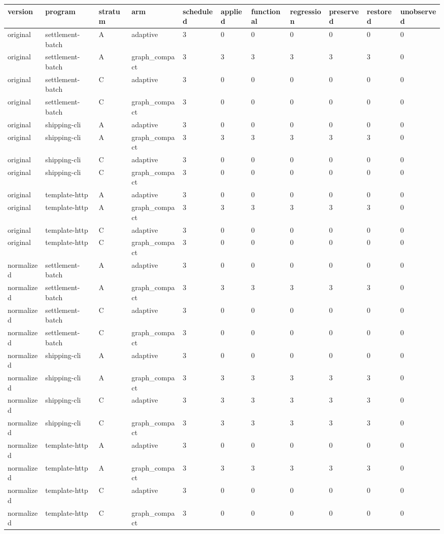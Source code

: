 \begin{tabular}{lllllllllll}
version & program & stratum & arm & scheduled & applied & functional & regression & preserved & restored & unobserved \\
\hline
original & settlement-batch & A & adaptive & 3 & 0 & 0 & 0 & 0 & 0 & 0 \\
original & settlement-batch & A & graph\_compact & 3 & 3 & 3 & 3 & 3 & 3 & 0 \\
original & settlement-batch & C & adaptive & 3 & 0 & 0 & 0 & 0 & 0 & 0 \\
original & settlement-batch & C & graph\_compact & 3 & 0 & 0 & 0 & 0 & 0 & 0 \\
original & shipping-cli & A & adaptive & 3 & 0 & 0 & 0 & 0 & 0 & 0 \\
original & shipping-cli & A & graph\_compact & 3 & 3 & 3 & 3 & 3 & 3 & 0 \\
original & shipping-cli & C & adaptive & 3 & 0 & 0 & 0 & 0 & 0 & 0 \\
original & shipping-cli & C & graph\_compact & 3 & 0 & 0 & 0 & 0 & 0 & 0 \\
original & template-http & A & adaptive & 3 & 0 & 0 & 0 & 0 & 0 & 0 \\
original & template-http & A & graph\_compact & 3 & 3 & 3 & 3 & 3 & 3 & 0 \\
original & template-http & C & adaptive & 3 & 0 & 0 & 0 & 0 & 0 & 0 \\
original & template-http & C & graph\_compact & 3 & 0 & 0 & 0 & 0 & 0 & 0 \\
normalized & settlement-batch & A & adaptive & 3 & 0 & 0 & 0 & 0 & 0 & 0 \\
normalized & settlement-batch & A & graph\_compact & 3 & 3 & 3 & 3 & 3 & 3 & 0 \\
normalized & settlement-batch & C & adaptive & 3 & 0 & 0 & 0 & 0 & 0 & 0 \\
normalized & settlement-batch & C & graph\_compact & 3 & 0 & 0 & 0 & 0 & 0 & 0 \\
normalized & shipping-cli & A & adaptive & 3 & 0 & 0 & 0 & 0 & 0 & 0 \\
normalized & shipping-cli & A & graph\_compact & 3 & 3 & 3 & 3 & 3 & 3 & 0 \\
normalized & shipping-cli & C & adaptive & 3 & 3 & 3 & 3 & 3 & 3 & 0 \\
normalized & shipping-cli & C & graph\_compact & 3 & 3 & 3 & 3 & 3 & 3 & 0 \\
normalized & template-http & A & adaptive & 3 & 0 & 0 & 0 & 0 & 0 & 0 \\
normalized & template-http & A & graph\_compact & 3 & 3 & 3 & 3 & 3 & 3 & 0 \\
normalized & template-http & C & adaptive & 3 & 0 & 0 & 0 & 0 & 0 & 0 \\
normalized & template-http & C & graph\_compact & 3 & 0 & 0 & 0 & 0 & 0 & 0 \\
\end{tabular}
